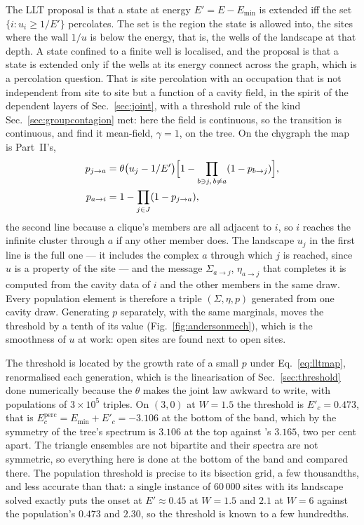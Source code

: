 The LLT proposal is that a state at energy $E'=E-E_{\min}$ is extended iff
the set $\{i:u_{i}\ge1/E'\}$ percolates. The set is the region the state
is allowed into, the sites where the wall $1/u$ is below the energy, that
is, the wells of the landscape at that depth. A state confined to a
finite well is localised, and the proposal is that a state is extended
only if the wells at its energy connect across the graph, which is a
percolation question. That is site percolation with an
occupation that is not independent from site to site but a function of a
cavity field, in the spirit of the dependent layers of
Sec.~\ref{sec:joint}, with a threshold rule of the kind Sec.~\ref{sec:groupcontagion}
met: here the field is continuous, so the transition is continuous, and
\citeauthor{tonetti2026} find it mean-field, $\gamma=1$, on the tree. On the
chygraph the map is Part~II's,
\begin{equation}
  \begin{aligned}
  p_{j\to a}&=\theta\bigl(u_{j}-1/E'\bigr)
  \Bigl[1-\prod_{b\ni j,\,b\ne a}(1-p_{b\to j})\Bigr],\\
  p_{a\to i}&=1-\prod_{j\in J}(1-p_{j\to a}),
  \end{aligned}
  \label{eq:lltmap}
\end{equation}
the second line because a clique's members are all adjacent to $i$, so $i$
reaches the infinite cluster through $a$ if any other member does. The
landscape $u_{j}$ in the first line is the full one --- it includes the
complex $a$ through which $j$ is reached, since $u$ is a property of the
site --- and the message $\Sigma_{a\to j}$, $\eta_{a\to j}$ that completes
it is computed from the cavity data of $i$ and the other members in the
same draw.
Every population element is therefore a triple $(\Sigma,\eta,p)$ generated
from one cavity draw. Generating $p$ separately, with the same marginals,
moves the threshold by a tenth of its value (Fig.~\ref{fig:andersonmech}), which is the
smoothness of $u$ at work: open sites are found next to open sites.

The threshold is located by the growth rate of a small $p$ under
Eq.~\eqref{eq:lltmap}, renormalised each generation, which is the
linearisation of Sec.~\ref{sec:threshold} done numerically because the
$\theta$ makes the joint law awkward to write, with populations of
$3\times10^{5}$ triples. On $(3,0)$ at $W=1.5$ the threshold is
$E'_{c}=0.473$, that is $E_{c}^{\mathrm{perc}}=E_{\min}+E'_{c}=-3.106$
at the bottom of the band, which by the symmetry of the tree's spectrum is
$3.106$ at the top against \citeauthor{tonetti2026}'s $3.165$, two per cent
apart. The triangle ensembles are not bipartite and their spectra are not
symmetric, so everything here is done at the bottom of the band and
compared there. The population threshold is precise to its bisection grid, a few thousandths, and less accurate than that: a single instance of $60\,000$ sites
with its landscape solved exactly puts the onset at $E'\approx0.45$ at
$W=1.5$ and $2.1$ at $W=6$ against the population's $0.473$ and $2.30$,
so the threshold is known to a few hundredths.

